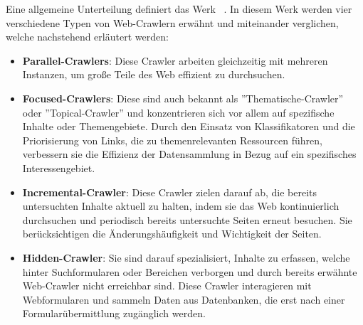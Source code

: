 Eine allgemeine Unterteilung definiert das Werk ~\parencite[vgl.][S. 1-3]{sharma2015anatomy}{}{}. In diesem Werk werden vier verschiedene Typen von Web-Crawlern erwähnt und miteinander verglichen, welche nachstehend erläutert werden:

\begin{itemize}
    \item \textbf{Parallel-Crawlers}: Diese Crawler arbeiten gleichzeitig mit mehreren Instanzen, um große Teile des Web effizient zu durchsuchen.
    \item \textbf{Focused-Crawlers}: Diese sind auch bekannt als ''Thematische-Crawler'' oder ''Topical-Crawler'' und konzentrieren sich vor allem auf spezifische Inhalte oder Themengebiete. Durch den Einsatz von Klassifikatoren und die Priorisierung von Links, die zu themenrelevanten Ressourcen führen, verbessern sie die Effizienz der Datensammlung in Bezug auf ein spezifisches Interessengebiet.
    
    \item \textbf{Incremental-Crawler}: Diese Crawler zielen darauf ab, die bereits untersuchten Inhalte aktuell zu halten, indem sie das Web kontinuierlich durchsuchen und periodisch bereits untersuchte Seiten erneut besuchen. Sie berücksichtigen die Änderungshäufigkeit und Wichtigkeit der Seiten.
    
    \item \textbf{Hidden-Crawler}: Sie sind darauf spezialisiert, Inhalte zu erfassen, welche hinter Suchformularen oder Bereichen verborgen und durch bereits erwähnte Web-Crawler nicht erreichbar sind. Diese Crawler interagieren mit Webformularen und sammeln Daten aus Datenbanken, die erst nach einer Formularübermittlung zugänglich werden.
\end{itemize}

